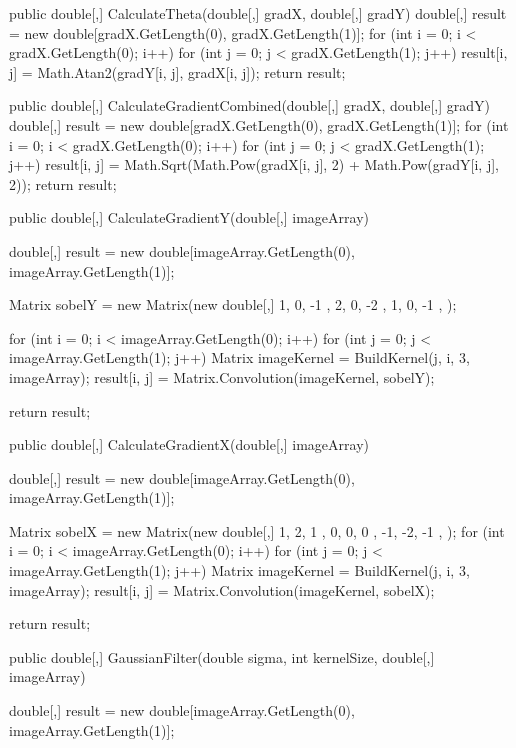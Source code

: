\begin{flushleft}
\begin{cscode}
{{        public double[,] CalculateTheta(double[,] gradX, double[,] gradY)
        {
            double[,] result = new double[gradX.GetLength(0), gradX.GetLength(1)];
            for (int i = 0; i < gradX.GetLength(0); i++) for (int j = 0; j < gradX.GetLength(1); j++) result[i, j] = Math.Atan2(gradY[i, j], gradX[i, j]);
            return result;
        }

        public double[,] CalculateGradientCombined(double[,] gradX, double[,] gradY)
        {
            double[,] result = new double[gradX.GetLength(0), gradX.GetLength(1)];
            for (int i = 0; i < gradX.GetLength(0); i++) for (int j = 0; j < gradX.GetLength(1); j++) result[i, j] = Math.Sqrt(Math.Pow(gradX[i, j], 2) + Math.Pow(gradY[i, j], 2));
            return result;
        }

        public double[,] CalculateGradientY(double[,] imageArray)
        {
            double[,] result = new double[imageArray.GetLength(0), imageArray.GetLength(1)];

            Matrix sobelY = new Matrix(new double[,] {
                { 1, 0, -1 },
                { 2, 0, -2 },
                { 1, 0, -1 },
            });


            for (int i = 0; i < imageArray.GetLength(0); i++)
            {
                for (int j = 0; j < imageArray.GetLength(1); j++)
                {
                    Matrix imageKernel = BuildKernel(j, i, 3, imageArray);
                    result[i, j] = Matrix.Convolution(imageKernel, sobelY);
                }
            }

            return result;
        }

        public double[,] CalculateGradientX(double[,] imageArray)
        {
            double[,] result = new double[imageArray.GetLength(0), imageArray.GetLength(1)];

            Matrix sobelX = new Matrix(new double[,] {
                {  1,  2,  1 },
                {  0,  0,  0 },
                { -1, -2, -1 },
            });
            for (int i = 0; i < imageArray.GetLength(0); i++)
            {
                for (int j = 0; j < imageArray.GetLength(1); j++)
                {
                    Matrix imageKernel = BuildKernel(j, i, 3, imageArray);
                    result[i, j] = Matrix.Convolution(imageKernel, sobelX);
                }
            }


            return result;
        }

        public double[,] GaussianFilter(double sigma, int kernelSize, double[,] imageArray)
        {
            double[,] result = new double[imageArray.GetLength(0), imageArray.GetLength(1)];

}}}
\end{cscode}
\end{flushleft}
